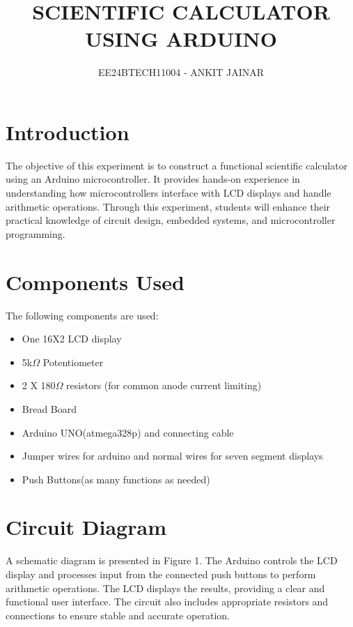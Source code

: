 \documentclass[journal]{IEEEtran}
\begin{document}

\vspace{3cm}

\title{SCIENTIFIC CALCULATOR USING ARDUINO}
\author{EE24BTECH11004 - ANKIT JAINAR}
\maketitle


\tableofcontents
\newpage

\section{Introduction}
The objective of this experiment is to construct a functional scientific calculator using an Arduino microcontroller. It provides hands-on experience in understanding how microcontrollers interface with LCD displays and handle arithmetic operations. Through this experiment, students will enhance their practical knowledge of circuit design, embedded systems, and microcontroller programming.


\section{Components Used}
The following components are used:
\begin{itemize}
 \item  One 16X2 LCD display
    \item 5k$\Omega$ Potentiometer
    \item 2 X 180$\Omega$ resistors (for common anode current limiting)
    \item Bread Board
    \item Arduino UNO(atmega328p) and connecting cable
    \item Jumper wires for arduino and normal wires for seven segment displays
    \item Push Buttons(as many functions as needed)
\end{itemize}

\section{Circuit Diagram}
A schematic diagram is presented in Figure 1. The Arduino controls the LCD display and processes input from the connected push buttons to perform arithmetic operations. The LCD displays the results, providing a clear and functional user interface. The circuit also includes appropriate resistors and connections to ensure stable and accurate operation.
\end{document}
